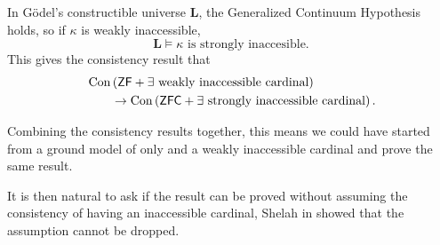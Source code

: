 In Gödel's constructible universe \(\mathbf{L}\), the Generalized Continuum Hypothesis holds,
so if \(\kappa\) is weakly inaccessible,
\[ \mathbf{L}\models \kappa\text{ is strongly inaccesible}. \]
This gives the consistency result that
\[
    \begin{split}
        &\operatorname{Con}\left(\mbox{\normalfont \textsf{ZF}} + \exists\text{ weakly inaccessible cardinal}\right) \\
        &\qquad \rightarrow \operatorname{Con}\left(\mbox{\normalfont \textsf{ZFC}} + \exists\text{ strongly inaccessible cardinal}\right).
    \end{split}
\]

Combining the consistency results together,
this means we could have started from a ground model of only \ZF and a weakly inaccessible cardinal and prove the same result.

It is then natural to ask if the result can be proved without assuming the consistency of having an inaccessible cardinal,
Shelah in \autocite{shelah1984} showed that the assumption cannot be dropped.

